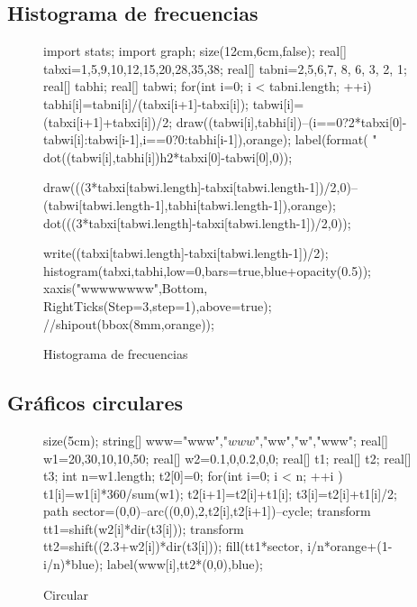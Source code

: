 \documentclass[a4paper]{report}
\begin{document}
\begin{t}
\subsection{Histograma de frecuencias}

\begin{figure}[!ht]
	\centering
	\begin{asy}
		import stats;
		import graph;
		size(12cm,6cm,false);
		real[] tabxi={1,5,9,10,12,15,20,28,35,38};
		real[] tabni={2,5,6,7, 8, 6, 3, 2, 1};
		real[] tabhi;
		real[] tabwi;
		for(int i=0; i < tabni.length; ++i){
		tabhi[i]=tabni[i]/(tabxi[i+1]-tabxi[i]);
		tabwi[i]=(tabxi[i+1]+tabxi[i])/2;
		draw((tabwi[i],tabhi[i])--(i==0?2*tabxi[0]-tabwi[i]:tabwi[i-1],i==0?0:tabhi[i-1]),orange);
		label(format( "%
		dot((tabwi[i],tabhi[i])^^(2*tabxi[0]-tabwi[0],0));
		}

		draw(((3*tabxi[tabwi.length]-tabxi[tabwi.length-1])/2,0)--(tabwi[tabwi.length-1],tabhi[tabwi.length-1]),orange);             dot(((3*tabxi[tabwi.length]-tabxi[tabwi.length-1])/2,0));

		write((tabxi[tabwi.length]-tabxi[tabwi.length-1])/2);
		histogram(tabxi,tabhi,low=0,bars=true,blue+opacity(0.5));
		xaxis("wwwwwwww",Bottom, RightTicks(Step=3,step=1),above=true);
		//shipout(bbox(8mm,orange));
	\end{asy}
	\caption{Histograma de frecuencias}
\end{figure}



\subsection{Gráficos circulares}

\begin{figure}[!ht]
	\centering
	\begin{asy}
		size(5cm);
		string[] www={"www","$www$","ww","w","www"};
		real[] w1={20,30,10,10,50};
		real[] w2={0.1,0,0.2,0,0};
		real[] t1;
		real[] t2;
		real[] t3;
		int n=w1.length;
		t2[0]=0;
		for(int i=0; i < n; ++i ){
		t1[i]=w1[i]*360/sum(w1);
		t2[i+1]=t2[i]+t1[i];
		t3[i]=t2[i]+t1[i]/2;
		path sector=(0,0)--arc((0,0),2,t2[i],t2[i+1])--cycle;
		transform tt1=shift(w2[i]*dir(t3[i]));
		transform tt2=shift((2.3+w2[i])*dir(t3[i]));
		fill(tt1*sector, i/n*orange+(1-i/n)*blue);
		label(www[i],tt2*(0,0),blue);
		}
	\end{asy}
	\caption{Circular}
\end{figure}



\end{t}
\end{document}
